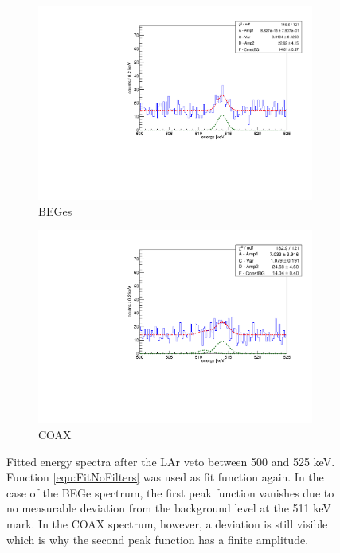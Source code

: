 \documentclass[encoding=utf8,british]{tumphthesis}
\begin{document}
\begin{figure}[t!]
	\centering
	\begin{subfigure}{.5\textwidth}
		\centering
		\includegraphics[width=\textwidth]{./Bilder/500525FitLArVetoBEGes.pdf}
		\caption{BEGes}
		\label{fig:FitLArVetoBEGes}
	\end{subfigure}\hfill%
	\begin{subfigure}{.5\textwidth}
		\centering
		\includegraphics[width=\textwidth]{./Bilder/500525FitLArVetoCOAX.pdf}
		\caption{COAX}
		\label{fig:FitLArVetoCOAX}
	\end{subfigure}
	\caption{
	Fitted energy spectra after the LAr veto between 500 and 525 keV. 
	Function \ref{equ:FitNoFilters} was used as fit function again. 
    In the case of the BEGe spectrum, the first peak function vanishes due to no measurable deviation from the background level at the 511 keV mark.
    In the COAX spectrum, however, a deviation is still visible which is why the second peak function has a finite amplitude.
	}
\end{figure}
\end{document}
